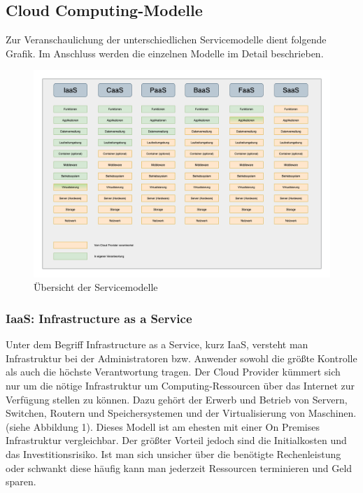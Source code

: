 \clearpage

\subsection{Cloud Computing-Modelle}
Zur Veranschaulichung der unterschiedlichen Servicemodelle dient folgende Grafik.
Im Anschluss werden die einzelnen Modelle im Detail beschrieben.


\begin{figure}[htbp]
    \centering
    \includegraphics[width=1.0\textwidth]{30-Serverless-Theorie/ServiceModelle.png}
    \caption{Übersicht der Servicemodelle}
    \label{fig:meine-grafik}
\end{figure}


   \subsubsection{IaaS: Infrastructure as a Service}
   Unter dem Begriff Infrastructure as a Service, kurz IaaS, versteht man Infrastruktur
   bei der Administratoren bzw. Anwender sowohl die größte Kontrolle als auch die höchste Verantwortung tragen.
   Der Cloud Provider kümmert sich nur um die nötige Infrastruktur um Computing-Ressourcen über das
   Internet zur Verfügung stellen zu können. Dazu gehört der Erwerb und Betrieb von Servern, Switchen, Routern und Speichersystemen und der
   Virtualisierung von Maschinen.(siehe Abbildung 1). Dieses Modell ist am ehesten mit einer On Premises Infrastruktur vergleichbar.
   Der größter Vorteil jedoch sind die Initialkosten und das Investitionsrisiko. Ist man sich unsicher über die benötigte Rechenleistung
   oder schwankt diese häufig kann man jederzeit Ressourcen terminieren und Geld sparen.

